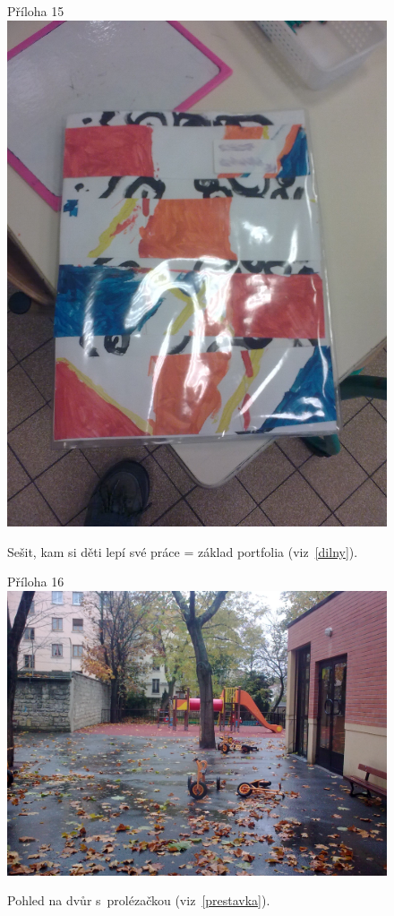 	\begin{figure}[tb]
		\centering
		Příloha 15\\
		\includegraphics[height=0.35\textheight]{./fotky/Obr15.jpg}
		\caption{
			Sešit, kam si děti lepí své práce = základ portfolia (viz~\ref{dilny}).
		}
		\label{Obr15}
	\end{figure}

	\begin{figure}[tb]
		\centering
		Příloha 16\\
		\includegraphics[height=0.35\textheight]{./fotky/Obr16.jpg}
		\caption{
			Pohled na dvůr s~prolézačkou (viz~\ref{prestavka}).
		}
		\label{Obr16}
	\end{figure}

